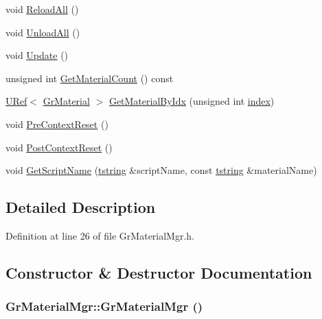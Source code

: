 \begin{CompactItemize}
\item 
void \hyperlink{class_gr_material_mgr_c0272e7cbc2981ad1996ac569346054f}{ReloadAll} ()
\item 
void \hyperlink{class_gr_material_mgr_24e6473a848193ef15400e817debc4a0}{UnloadAll} ()
\item 
void \hyperlink{class_gr_material_mgr_fd6d9312e225637c1300dc0703c853f7}{Update} ()
\item 
unsigned int \hyperlink{class_gr_material_mgr_2e5b48c6003f1d3449ba8dbff47d4fc7}{GetMaterialCount} () const 
\item 
\hyperlink{class_u_ref}{URef}$<$ \hyperlink{class_gr_material}{GrMaterial} $>$ \hyperlink{class_gr_material_mgr_ce15b2856e2cbcb867f012daac7e8ed2}{GetMaterialByIdx} (unsigned int \hyperlink{glext__bak_8h_57f14e05b1900f16a2da82ade47d0c6d}{index})
\item 
void \hyperlink{class_gr_material_mgr_e3b56eb5530047e084fb96c595da517b}{PreContextReset} ()
\item 
void \hyperlink{class_gr_material_mgr_daadacddba70859d762f1d776bfcfcb1}{PostContextReset} ()
\item 
void \hyperlink{class_gr_material_mgr_1bdfefc758711cf3d91e5a3cff632ffc}{GetScriptName} (\hyperlink{common__afx_8h_816fa58fd77499b0edb2c69ebe803d5c}{tstring} \&scriptName, const \hyperlink{common__afx_8h_816fa58fd77499b0edb2c69ebe803d5c}{tstring} \&materialName)
\end{CompactItemize}


\subsection{Detailed Description}


Definition at line 26 of file GrMaterialMgr.h.

\subsection{Constructor \& Destructor Documentation}
\hypertarget{class_gr_material_mgr_f8c35eace8645ea7aa4be86286438670}{
\subsubsection[{GrMaterialMgr}]{\setlength{\rightskip}{0pt plus 5cm}GrMaterialMgr::GrMaterialMgr ()}}
\label{class_gr_material_mgr_f8c35eace8645ea7aa4be86286438670}




